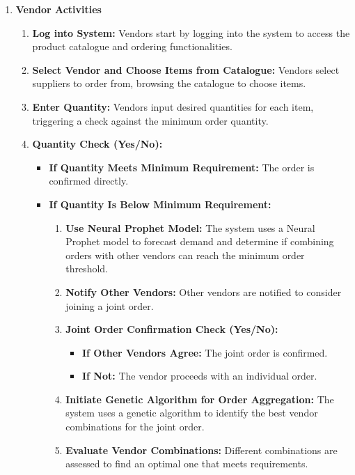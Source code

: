 \begin{enumerate}
    \item \textbf{Vendor Activities}
          \begin{enumerate}
              \item \textbf{Log into System:} Vendors start by logging into the system to access the product catalogue and ordering functionalities.
              \item \textbf{Select Vendor and Choose Items from Catalogue:} Vendors select suppliers to order from, browsing the catalogue to choose items.
              \item \textbf{Enter Quantity:} Vendors input desired quantities for each item, triggering a check against the minimum order quantity.
              \item \textbf{Quantity Check (Yes/No):}
                    \begin{itemize}
                        \item \textbf{If Quantity Meets Minimum Requirement:} The order is confirmed directly.
                        \item \textbf{If Quantity Is Below Minimum Requirement:}
                              \begin{enumerate}
                                  \item \textbf{Use Neural Prophet Model:} The system uses a Neural Prophet model to forecast demand and determine if combining orders with other vendors can reach the minimum order threshold.
                                  \item \textbf{Notify Other Vendors:} Other vendors are notified to consider joining a joint order.
                                  \item \textbf{Joint Order Confirmation Check (Yes/No):}
                                        \begin{itemize}
                                            \item \textbf{If Other Vendors Agree:} The joint order is confirmed.
                                            \item \textbf{If Not:} The vendor proceeds with an individual order.
                                        \end{itemize}
                                  \item \textbf{Initiate Genetic Algorithm for Order Aggregation:} The system uses a genetic algorithm to identify the best vendor combinations for the joint order.
                                  \item \textbf{Evaluate Vendor Combinations:} Different combinations are assessed to find an optimal one that meets requirements.

\end{enumerate}
\end{itemize}
\end{enumerate}
\end{enumerate}
